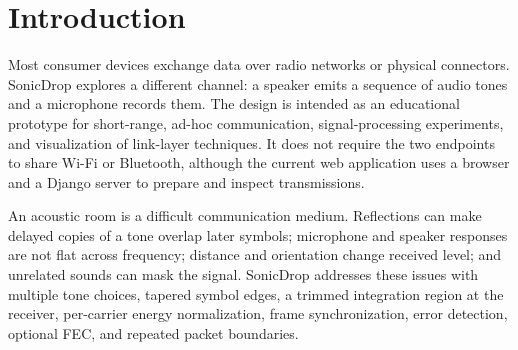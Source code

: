 \documentclass[11pt,a4paper]{article}
\begin{document}
\begin{abstract}
SonicDrop is a software-defined modem and web application for sending short text messages and small binary images through sound. The sender converts application data into packets, adds a compact header and CRC-8, optionally applies Run-Length Encoding (RLE) and Hamming(7,4) forward error correction, frames the bit stream using HDLC-style flags and bit stuffing, and synthesizes a mono M-FSK waveform. The receiver accepts a WAV recording or microphone audio, detects candidate tones, searches several symbol-timing offsets, checks frames, repairs correctable bit errors, and reconstructs packet content. The interface also exposes simulated channel noise, signal metrics, frame inspection, and a browser-coordinated acoustic ACK/NACK demonstration. This report describes the implemented pipeline and its assumptions, distinguishes nominal calculations from measured results, and identifies important prototype limitations---in particular, the custom passkey transform is not production-grade cryptography and the browser ARQ demonstration is not a complete transport protocol.
\end{abstract}

\tableofcontents
\clearpage

\section{Introduction}
\label{sec:introduction}

Most consumer devices exchange data over radio networks or physical connectors. SonicDrop explores a different channel: a speaker emits a sequence of audio tones and a microphone records them. The design is intended as an educational prototype for short-range, ad-hoc communication, signal-processing experiments, and visualization of link-layer techniques. It does not require the two endpoints to share Wi-Fi or Bluetooth, although the current web application uses a browser and a Django server to prepare and inspect transmissions.

An acoustic room is a difficult communication medium. Reflections can make delayed copies of a tone overlap later symbols; microphone and speaker responses are not flat across frequency; distance and orientation change received level; and unrelated sounds can mask the signal. SonicDrop addresses these issues with multiple tone choices, tapered symbol edges, a trimmed integration region at the receiver, per-carrier energy normalization, frame synchronization, error detection, optional FEC, and repeated packet boundaries.
\end{document}
